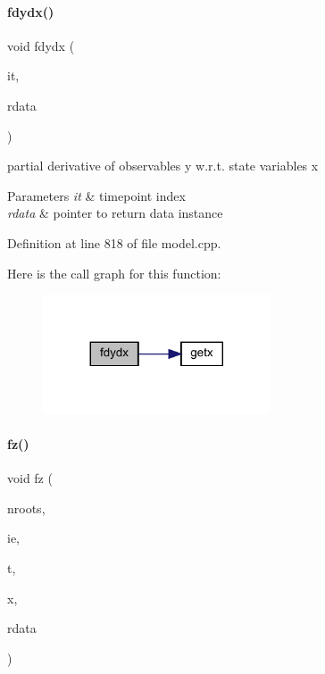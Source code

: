 \paragraph{\texorpdfstring{fdydx()}{fdydx()}\hspace{0.1cm}{\footnotesize\ttfamily [1/2]}}
{\footnotesize\ttfamily void fdydx (\begin{DoxyParamCaption}\item[{const int}]{it,  }\item[{\mbox{\hyperlink{classamici_1_1_return_data}{Return\+Data}} $\ast$}]{rdata }\end{DoxyParamCaption})}

partial derivative of observables y w.\+r.\+t. state variables x 
\begin{DoxyParams}{Parameters}
{\em it} & timepoint index \\
\hline
{\em rdata} & pointer to return data instance \\
\hline
\end{DoxyParams}


Definition at line 818 of file model.\+cpp.

Here is the call graph for this function\+:
\nopagebreak
\begin{figure}[H]
\begin{center}
\leavevmode
\includegraphics[width=191pt]{classamici_1_1_model_a3ec46e89aed7bd191fb21ac3e501edd2_cgraph}
\end{center}
\end{figure}
\mbox{\label{classamici_1_1_model_a34f0ec7e922c0817b08d0021dba9c36f}} 
\paragraph{\texorpdfstring{fz()}{fz()}\hspace{0.1cm}{\footnotesize\ttfamily [1/2]}}
{\footnotesize\ttfamily void fz (\begin{DoxyParamCaption}\item[{const int}]{nroots,  }\item[{const int}]{ie,  }\item[{const \mbox{\hyperlink{namespaceamici_a1bdce28051d6a53868f7ccbf5f2c14a3}{realtype}}}]{t,  }\item[{const \mbox{\hyperlink{classamici_1_1_ami_vector}{Ami\+Vector}} $\ast$}]{x,  }\item[{\mbox{\hyperlink{classamici_1_1_return_data}{Return\+Data}} $\ast$}]{rdata }\end{DoxyParamCaption})}

